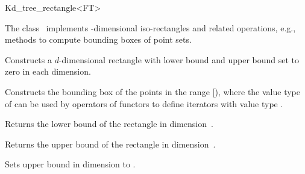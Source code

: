 

\begin{ccRefClass}{Kd_tree_rectangle<FT>}  %

\begin{ccAdvanced}


\ccDefinition
  
The class \ccRefName\ implements -dimensional iso-rectangles and related operations,
e.g., methods to compute bounding boxes of point sets. 




\ccTypes


\ccCreation
{}  %

{Constructs a $d$-dimensional rectangle  with lower bound and upper bound set to zero 
in each dimension.}
 
{Constructs the bounding box of the points in the range [), where the value
type of  can be used by operators of functors 
to define iterators with value type .}

\ccOperations

{Returns the lower bound of the rectangle in dimension~.}

{Returns the upper bound of the rectangle in dimension~.}



{Sets upper bound in dimension  to .}


\end{ccAdvanced}
\end{ccRefClass}
